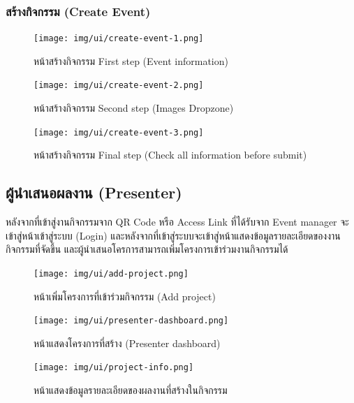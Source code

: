 \clearpage
\subsubsection{สร้างกิจกรรม (Create Event)}
\begin{figure}[h]
    \begin{center}
        \texttt{[image: img/ui/create-event-1.png]}
    \end{center}
    \caption{หน้าสร้างกิจกรรม First step (Event information)}
    \label{fig:create-event}
    \begin{center}
        \texttt{[image: img/ui/create-event-2.png]}
    \end{center}
    \caption{หน้าสร้างกิจกรรม Second step (Images Dropzone)}
    \label{fig:create-event-2}
\end{figure}

\clearpage
\begin{figure}[ht]
    \begin{center}
        \texttt{[image: img/ui/create-event-3.png]}
    \end{center}
    \caption{หน้าสร้างกิจกรรม Final step (Check all information before submit)}
    \label{fig:create-event-3}
\end{figure}

\clearpage
\subsection{ผู้นำเสนอผลงาน (Presenter)}
หลังจากที่เข้าสู่งานกิจกรรมจาก QR Code หรือ Access Link ที่ได้รับจาก Event manager จะเข้าสู่หน้าเข้าสู่ระบบ (Login) และหลังจากที่เข้าสู่ระบบจะเข้าสู่หน้าแสดงข้อมูลรายละเอียดของงานกิจกรรมที่จัดขึ้น และผู้นำเสนอโครการสามารถเพิ่มโครงการเข้าร่วมงานกิจกรรมได้
\begin{figure}[h]
    \begin{center}
        \texttt{[image: img/ui/add-project.png]}
    \end{center}
    \caption{หน้าเพิ่มโครงการที่เข้าร่วมกิจกรรม (Add project)}
    \label{fig:add-project}

    \begin{center}
        \texttt{[image: img/ui/presenter-dashboard.png]}
    \end{center}
    \caption{หน้าแสดงโครงการที่สร้าง (Presenter dashboard)}
    \label{fig:presenter-dashboard}
\end{figure}

\clearpage
\begin{figure}[ht]
    \begin{center}
        \texttt{[image: img/ui/project-info.png]}
    \end{center}
    \caption{หน้าแสดงข้อมูลรายละเอียดของผลงานที่สร้างในกิจกรรม}
    \label{fig:project-info}
\end{figure}
\clearpage %

